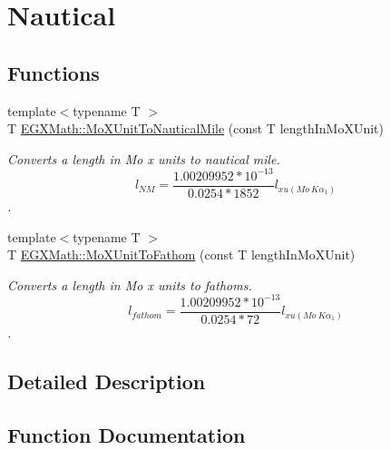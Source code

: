 \hypertarget{group___e_g_x_math-_conversions-_length_conversions-_non-_s_i-_mo_x_unit-_nautical}{}\section{Nautical}
\label{group___e_g_x_math-_conversions-_length_conversions-_non-_s_i-_mo_x_unit-_nautical}
\subsection*{Functions}
\begin{DoxyCompactItemize}
\item 
{\footnotesize template$<$typename T $>$ }\\T \mbox{\hyperlink{group___e_g_x_math-_conversions-_length_conversions-_non-_s_i-_mo_x_unit-_nautical_ga034fe0d8e6dbb0b0a588099a5b9d2c51}{E\+G\+X\+Math\+::\+Mo\+X\+Unit\+To\+Nautical\+Mile}} (const T length\+In\+Mo\+X\+Unit)
\begin{DoxyCompactList}\small\item\em Converts a length in Mo x units to nautical mile. \[ l_{NM}= \frac{1.00209952*10^{-13}}{0.0254 * 1852} l_{xu(Mo\ K\alpha_1)} \]. \end{DoxyCompactList}\item 
{\footnotesize template$<$typename T $>$ }\\T \mbox{\hyperlink{group___e_g_x_math-_conversions-_length_conversions-_non-_s_i-_mo_x_unit-_nautical_gaac0c77d19dcc5ce04affa038de610b4a}{E\+G\+X\+Math\+::\+Mo\+X\+Unit\+To\+Fathom}} (const T length\+In\+Mo\+X\+Unit)
\begin{DoxyCompactList}\small\item\em Converts a length in Mo x units to fathoms. \[ l_{fathom}= \frac{1.00209952*10^{-13}}{0.0254 * 72} l_{xu(Mo\ K\alpha_1)} \]. \end{DoxyCompactList}\end{DoxyCompactItemize}


\subsection{Detailed Description}


\subsection{Function Documentation}
\mbox{\label{group___e_g_x_math-_conversions-_length_conversions-_non-_s_i-_mo_x_unit-_nautical_gaac0c77d19dcc5ce04affa038de610b4a}} 
